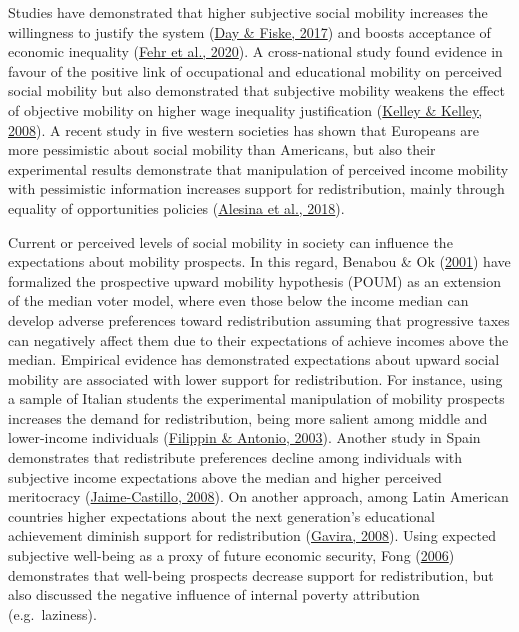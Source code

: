 \documentclass[
  12pt,
]{book}
\begin{document}
Studies have demonstrated that higher subjective social mobility increases the willingness to justify the system (\protect\hyperlink{ref-Day2017}{Day \& Fiske, 2017}) and boosts acceptance of economic inequality (\protect\hyperlink{ref-fehr_social_2020}{Fehr et al., 2020}). A cross-national study found evidence in favour of the positive link of occupational and educational mobility on perceived social mobility but also demonstrated that subjective mobility weakens the effect of objective mobility on higher wage inequality justification (\protect\hyperlink{ref-kelley_subjective_2008}{Kelley \& Kelley, 2008}). A recent study in five western societies has shown that Europeans are more pessimistic about social mobility than Americans, but also their experimental results demonstrate that manipulation of perceived income mobility with pessimistic information increases support for redistribution, mainly through equality of opportunities policies (\protect\hyperlink{ref-alesina_intergenerational_2018}{Alesina et al., 2018}).

Current or perceived levels of social mobility in society can influence the expectations about mobility prospects. In this regard, Benabou \& Ok (\protect\hyperlink{ref-benabou_social_2001}{2001}) have formalized the prospective upward mobility hypothesis (POUM) as an extension of the median voter model, where even those below the income median can develop adverse preferences toward redistribution assuming that progressive taxes can negatively affect them due to their expectations of achieve incomes above the median. Empirical evidence has demonstrated expectations about upward social mobility are associated with lower support for redistribution. For instance, using a sample of Italian students the experimental manipulation of mobility prospects increases the demand for redistribution, being more salient among middle and lower-income individuals (\protect\hyperlink{ref-Filippin2003}{Filippin \& Antonio, 2003}). Another study in Spain demonstrates that redistribute preferences decline among individuals with subjective income expectations above the median and higher perceived meritocracy (\protect\hyperlink{ref-Jaime-Castillo2008}{Jaime-Castillo, 2008}). On another approach, among Latin American countries higher expectations about the next generation's educational achievement diminish support for redistribution (\protect\hyperlink{ref-gavira_social_2008}{Gavira, 2008}). Using expected subjective well-being as a proxy of future economic security, Fong (\protect\hyperlink{ref-fong_prospective_2006}{2006}) demonstrates that well-being prospects decrease support for redistribution, but also discussed the negative influence of internal poverty attribution (e.g.~laziness).
\end{document}
